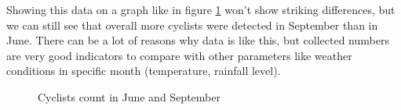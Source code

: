 Showing this data on a graph like in figure \ref{fig:j-s2} won't show striking differences, but we can still see that overall more cyclists were detected in September than in June. There can be a lot of reasons why data is like this, but collected numbers are very good indicators to compare with other parameters like weather conditions in specific month (temperature, rainfall level).
\begin{figure}
    \centering
    \caption{Cyclists count in June and September}
    \label{fig:j-s2}
\end{figure}